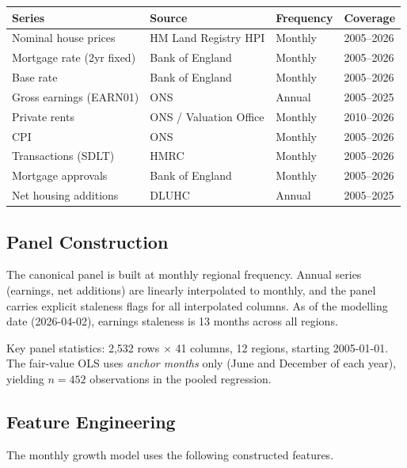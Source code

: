 \documentclass[11pt,a4paper]{article}
\theoremstyle{plain}
\theoremstyle{definition}
\begin{document}
\begin{center}
\small
\begin{tabular}{llll}
\toprule
Series & Source & Frequency & Coverage \\
\midrule
Nominal house prices     & HM Land Registry HPI     & Monthly  & 2005--2026 \\
Mortgage rate (2yr fixed) & Bank of England          & Monthly  & 2005--2026 \\
Base rate                & Bank of England          & Monthly  & 2005--2026 \\
Gross earnings (EARN01)  & ONS                      & Annual   & 2005--2025 \\
Private rents            & ONS / Valuation Office   & Monthly  & 2010--2026 \\
CPI                      & ONS                      & Monthly  & 2005--2026 \\
Transactions (SDLT)      & HMRC                     & Monthly  & 2005--2026 \\
Mortgage approvals       & Bank of England          & Monthly  & 2005--2026 \\
Net housing additions    & DLUHC                    & Annual   & 2005--2025 \\
\bottomrule
\end{tabular}
\end{center}

\subsection{Panel Construction}

The canonical panel is built at monthly regional frequency.
Annual series (earnings, net additions) are linearly interpolated to
monthly, and the panel carries explicit staleness flags for all interpolated
columns.  As of the modelling date (2026-04-02), earnings staleness is
13 months across all regions.

Key panel statistics: 2,532 rows $\times$ 41 columns, 12 regions,
starting 2005-01-01.  The fair-value OLS uses \emph{anchor months} only
(June and December of each year), yielding $n = 452$ observations in
the pooled regression.

\subsection{Feature Engineering}

The monthly growth model uses the following constructed features.
\end{document}
